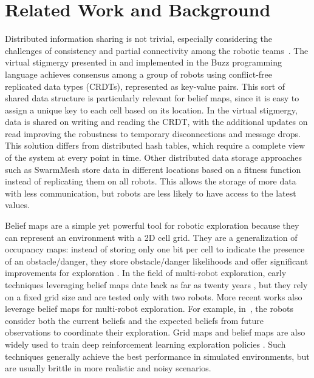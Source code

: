 \documentclass[letterpaper, 10 pt, conference]{ieeeconf}
\begin{document}
\section{Related Work and Background}
Distributed information sharing is not trivial, especially considering
the challenges of consistency and partial connectivity among the
robotic teams~\cite{amigoni2017multirobot}. The virtual stigmergy
presented in \cite{pinciroliTuple2016} and implemented in the Buzz
programming language \cite{pinciroliBuzz2016} achieves consensus among
a group of robots using conflict-free replicated data types (CRDTs),
represented as key-value pairs. This sort of shared data structure is
particularly relevant for belief maps, since it is easy to assign a
unique key to each cell based on its location.  In the virtual
stigmergy, data is shared on writing and reading the CRDT, with the
additional updates on read improving the robustness to temporary
disconnections and message drops. This solution differs from
distributed hash tables, which require a complete view of the system
at every point in time. Other distributed data storage approaches such
as SwarmMesh \cite{majcherczykSwarmmesh2020} store data in different
locations based on a fitness function instead of replicating them on
all robots. This allows the storage of more data with less
communication, but robots are less likely to have access to the latest
values.

Belief maps are a simple yet powerful tool for robotic exploration
because they can represent an environment with a 2D cell grid. They
are a generalization of occupancy maps: instead of storing only one
bit per cell to indicate the presence of an obstacle/danger, they
store obstacle/danger likelihoods and offer significant improvements
for exploration \cite{stachnissMappingExplorationMobile2003}. In the
field of multi-robot exploration, early techniques leveraging belief
maps date back as far as twenty years
\cite{kobayashiSharingExploringInformation2002,kobayashiDeterminationExplorationTarget2003},
but they rely on a fixed grid size and are tested only with two
robots. More recent works also leverage belief maps for multi-robot
exploration. For example,
in~\cite{indelmanCooperativeMultirobotBelief2018}, the robots consider
both the current beliefs and the expected beliefs from future
observations to coordinate their exploration. Grid maps and belief
maps are also widely used to train deep reinforcement learning
exploration policies
\cite{hanGridWiseControlMultiAgent,panovGridPathPlanning2018}. Such
techniques generally achieve the best performance in simulated
environments, but are usually brittle in more realistic and noisy
scenarios.
\end{document}
